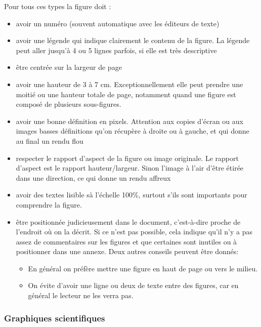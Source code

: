 Pour tous ces types la figure doit :
\begin{itemize}
\item avoir un numéro  (souvent automatique avec les éditeurs de texte)
\item avoir une légende qui indique clairement le contenu de la figure. La légende peut aller jusqu'à 4 ou 5 lignes parfois, si elle est très descriptive
\item  être centrée sur la largeur de page
\item  avoir une hauteur de 3 à 7 cm. Exceptionnellement elle peut prendre une moitié ou une hauteur totale de page, notamment quand une figure est composé de plusieurs sous-figures.
\item avoir une bonne définition en pixels. Attention aux copies d'écran ou aux images basses définitions qu'on récupère à droite ou à gauche, et qui donne au final un rendu flou
\item respecter le rapport d'aspect de la figure ou image originale. Le rapport d'aspect est le rapport hauteur/largeur. Sinon l'image à l'air d'être étirée dans une direction, ce qui donne un rendu affreux
\item  avoir des  textes  lisible sà l'échelle  100\%, surtout  s'ils sont importants pour comprendre la figure.
\item être positionnée judicieusement dans le document, c'est-à-dire proche de l'endroit où on la décrit. Si ce n'est pas possible, cela indique qu'il n'y a pas assez de commentaires sur les figures et que certaines sont inutiles ou à positionner dans une annexe. 
Deux autres conseils peuvent être donnés:
\begin{itemize}
\item En général on préfère mettre une figure en haut de page ou vers le milieu. 
\item On évite d'avoir une ligne ou deux de texte entre des figures, car en général le lecteur ne les verra pas.
\end{itemize}


\end{itemize}

\subsubsection{Graphiques scientifiques}

